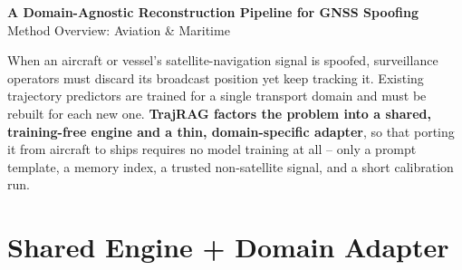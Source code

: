 \documentclass[10pt]{article}
\begin{document}
\begin{center}
{\LARGE\bfseries A Domain-Agnostic Reconstruction Pipeline for GNSS Spoofing}\\[2pt]
{\large Method Overview: Aviation \& Maritime}
\end{center}
\vspace{2pt}

When an aircraft or vessel's satellite-navigation signal is spoofed,
surveillance operators must discard its broadcast position yet keep
tracking it. Existing trajectory predictors are trained for a single
transport domain and must be rebuilt for each new one. \textbf{TrajRAG
factors the problem into a shared, training-free engine and a thin,
domain-specific adapter}, so that porting it from aircraft to ships requires
no model training at all -- only a prompt template, a memory index, a
trusted non-satellite signal, and a short calibration run.

\section*{Shared Engine + Domain Adapter}
\end{document}
